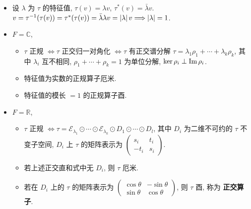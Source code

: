 \documentclass{note}
\begin{document}
\begin{pf}
\begin{itemize}
        ``$\Longleftarrow$'': 若 $\tau(\mathcal{O})$ 为正交归一基, 则 $\forall u,v\in V$, $u=\sum_{i=1}^n\alpha_io_i$, $v=\sum_{j=1}^n\beta_jo_j$,\\
        $\langle\tau(u),\tau(v)\rangle=\langle\tau\left(\sum_{i=1}^n\alpha_io_i\right),\tau\left(\sum_{j=1}^n\beta_io_i\right)\rangle=\sum_{i,j=1}^n\alpha_i\overline{\beta_j}\langle\tau(o_i),\tau(o_j)\rangle=\sum_{i,j=1}^n\alpha_i\beta_j\delta_{ij}=\sum_{i=1}^n\alpha_i\beta_j=\sum_{i=1}^n\alpha_i\overline{\beta_j}\delta_{ij}=\sum_{i,j=1}^n\alpha_i\overline{\beta_j}\langle o_i,o_j\rangle=\langle\sum_{i=1}^n\alpha_io_i,\sum_{j=1}^n\beta_jo_j\rangle=\langle u,v\rangle\Longrightarrow\tau$ 等距同构 $\Longrightarrow\tau$ 酉.
        \item[(4)] 设 $\lambda$ 为 $\tau$ 的特征值, $\tau(v)=\lambda v$, $\tau^*(v)=\bar{\lambda}v$.\\
        $v=\tau^{-1}(\tau(v))=\tau^*(\tau(v))=\bar{\lambda}\lambda v=\left\lvert\lambda\right\rvert v\Longrightarrow\left\lvert\lambda\right\rvert=1$.
    \end{itemize}
\end{pf}

\begin{thm}
    \begin{itemize}
        \item[(1)] $F=\mathbb{C}$,
        \begin{itemize}
            \item[(a)] $\tau$ 正规 $\Longleftrightarrow\tau$ 正交归一对角化 $\Longleftrightarrow\tau$ 有正交谱分解 $\tau=\lambda_1\rho_1+\cdots+\lambda_k\rho_k$, 其中 $\lambda_i$ 互不相同, $\rho_1+\cdots+\rho_k=1$ 为单位分解, $\ker\rho_i\perp\operatorname{Im}\rho_i$.
            \item[(b)] 特征值为实数的正规算子厄米.
            \item[(c)] 特征值的模长 $=1$ 的正规算子酉.
        \end{itemize}
        \item[(2)] $F=\mathbb{R}$,
        \begin{itemize}
            \item[(a)] $\tau$ 正规 $\Longleftrightarrow\tau=\mathcal{E}_{\lambda_1}\odot\cdots\odot\mathcal{E}_{\lambda_k}\odot D_1\odot\cdots\odot D_l$, 其中 $D_i$ 为二维不可约的 $\tau$ 不变子空间, $D_i$ 上 $\tau$ 的矩阵表示为 $\begin{pmatrix}
                s_i&t_i\\
                -t_i&s_i
            \end{pmatrix}$.
            \item[(b)] 若上述正交直和式中无 $D_i$, 则 $\tau$ 厄米.
            \item[(c)] 若在 $D_i$ 上的 $\tau$ 的矩阵表示为 $\begin{pmatrix}
                \cos\theta&-\sin\theta\\
                \sin\theta&\cos\theta
            \end{pmatrix}$, 则 $\tau$ 酉, 称为 \textbf{正交算子}.
        \end{itemize}
    \end{itemize}
\end{thm}
\end{document}
